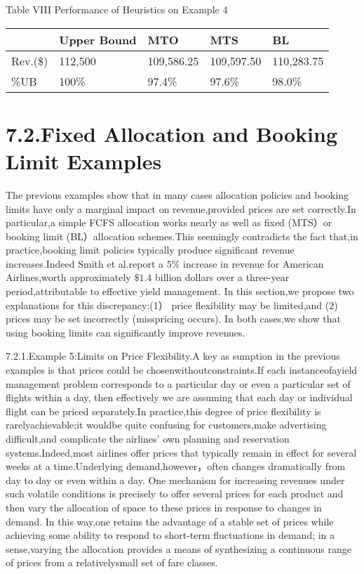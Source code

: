 Table VIII Performance of Heuristics on Example 4

\begin{longtable}[]{@{}|l|l|l|l|l|@{}}
\toprule\noalign{}
\endhead
\bottomrule\noalign{}
\endlastfoot
\hline
& Upper Bound & MTO & MTS & BL \\
\hline
Rev.(\$) & 112,500 & 109,586.25 & 109,597.50 & 110,283.75 \\
\hline
\%UB & 100\% & 97.4\% & 97.6\% & 98.0\% \\
\hline
\end{longtable}

\section{7.2.Fixed Allocation and Booking Limit
Examples}\label{fixed-allocation-and-booking-limit-examples}

The previous examples show that in many cases allocation policies and
booking limits have only a marginal impact on revenue,provided prices
are set correctly.In particular,a simple FCFS allocation works nearly as
well as fixed (MTS）or booking limit (BL）allocation schemes.This
seemingly contradicts the fact that,in practice,booking limit policies
typically produce significant revenue increases.Indeed Smith et
al.report a \(5 \%\) increase in revenue for American Airlines,worth
approximately \(\$ 1.4\) billion dollars over a three-year
period,attributable to effective yield management. In this section,we
propose two explanations for this discrepancy:(1） price flexibility may
be limited,and (2) prices may be set incorrectly (misspricing occurs).
In both cases,we show that using booking limits can significantly
improve revenues.

7.2.1.Example 5:Limits on Price Flexibility.A key as sumption in the
previous examples is that prices could be chosenwithoutconstraints.If
each instanceofayield management problem corresponds to a particular day
or even a particular set of flights within a day, then effectively we
are assuming that each day or individual flight can be priced
separately.In practice,this degree of price flexibility is
rarelyachievable;it wouldbe quite confusing for customers,make
advertising difficult,and complicate the airlines' own planning and
reservation systems.Indeed,most airlines offer prices that typically
remain in effect for several weeks at a time.Underlying
demand,however，often changes dramatically from day to day or even
within a day. One mechanism for increasing revenues under such volatile
conditions is precisely to offer several prices for each product and
then vary the allocation of space to these prices in response to changes
in demand. In this way,one retains the advantage of a stable set of
prices while achieving some ability to respond to short-term
fluctuations in demand; in a sense,varying the allocation provides a
means of synthesizing a continuous range of prices from a
relativelysmall set of fare classes.

